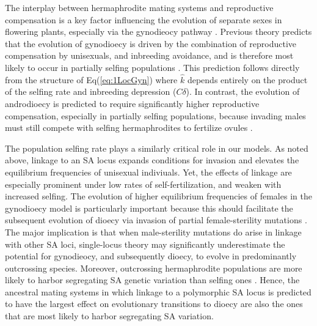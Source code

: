 \documentclass{article}
\begin{document}
The interplay between hermaphrodite mating systems and reproductive compensation is a key factor influencing the evolution of separate sexes in flowering plants, especially via the gynodieocy pathway \citep{Darwin1877,Charlesworth1978a}. Previous theory predicts that the evolution of gynodioecy is driven by the combination of reproductive compensation by unisexuals, and inbreeding avoidance, and is therefore most likely to occur in partially selfing populations \citep{Lewis1942,Lloyd1975,Charlesworth1978a,KaferPannell2017}. This prediction follows directly from the structure of Eq(\ref{eq:1LocGyn}) where $\hat{k}$ depends entirely on the product of the selfing rate and inbreeding depression ($C \delta$). In contrast, the evolution of androdioecy is predicted to require significantly higher reproductive compensation, especially in partially selfing populations, because invading males must still compete with selfing hermaphrodites to fertilize ovules \citep{Charlesworth1978b,KaferPannell2017}. 

The population selfing rate plays a similarly critical role in our models. As noted above, linkage to an SA locus expands conditions for invasion and elevates the equilibrium frequencies of unisexual indiviuals. Yet, the effects of linkage are especially prominent under low rates of self-fertilization, and weaken with increased selfing. The evolution of higher equilibrium frequencies of females in the gynodioecy model is particularly important because this should facilitate the subsequent evolution of dioecy via invasion of partial female-sterility mutations \citep{Charlesworth1978a,Charlesworth1978b,Charlesworth1999,Charlesworth2006}. The major implication is that when male-sterility mutations do arise in linkage with other SA loci, single-locus theory may significantly underestimate the potential for gynodieocy, and subsequently dioecy, to evolve in predominantly outcrossing species. Moreover, outcrossing hermaphrodite populations are more likely to harbor segregating SA genetic variation than selfing ones \citep{JordanConnallon2014,Olito2016}. Hence, the ancestral mating systems in which linkage to a polymorphic SA locus is predicted to have the largest effect on evolutionary transitions to dioecy are also the ones that are most likely to harbor segregating SA variation. 
\end{document}

